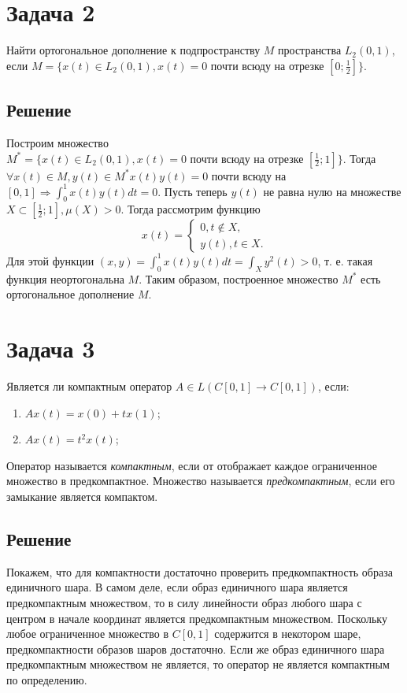 \documentclass[11pt]{article}
\begin{document}
\section{Задача 2}
\label{sec:orgfe02e9f}
Найти ортогональное дополнение к подпространству \(M\) пространства \(L_2(0, 1)\), если \(M = \{x(t) \in L_2(0, 1), x(t) = 0 \text{ почти всюду на отрезке }[0; \frac12]\}\).
\subsection{Решение}
\label{sec:org3e93dc5}
Построим множество \(M^* = \{x(t) \in L_2(0, 1), x(t) = 0 \text{ почти всюду на отрезке } [\frac12; 1]\}\). Тогда \(\forall x(t) \in M, y(t) \in M^* x(t)y(t) = 0\) почти всюду на \([0, 1] \Rightarrow \int_0^1x(t)y(t)dt = 0\). Пусть теперь \(y(t)\) не равна нулю на множестве \(X \subset [\frac12; 1], \mu(X) > 0\). Тогда рассмотрим функцию
\begin{equation*}
x(t) = \begin{cases}
0, t \notin X, \\
y(t), t \in X.
\end{cases}
\end{equation*}
Для этой функции \((x, y) = \int_0^1x(t)y(t)dt = \int_Xy^2(t) > 0\), т. е. такая функция неортогональна \(M\). Таким образом, построенное множество \(M^*\) есть ортогональное дополнение \(M\).
\section{Задача 3}
\label{sec:org2d7f3b7}
Является ли компактным оператор \(A \in L(C[0, 1] \rightarrow C[0, 1])\), если:
\begin{enumerate}
\item \(Ax(t) = x(0) + tx(1)\);
\item \(Ax(t) = t^2x(t)\);
\end{enumerate}
Оператор называется \emph{компактным}, если от отображает каждое ограниченное множество в предкомпактное. Множество называется \emph{предкомпактным}, если его замыкание является компактом.
\subsection{Решение}
\label{sec:orgfeb8695}
Покажем, что для компактности достаточно проверить предкомпактность образа единичного шара. В самом деле, если образ единичного шара является предкомпактным множеством, то в силу линейности образ любого шара с центром в начале координат является предкомпактным множеством. Поскольку любое ограниченное множество в \(C[0, 1]\) содержится в некотором шаре, предкомпактности образов шаров достаточно. Если же образ единичного шара предкомпактным множеством не является, то оператор не является компактным по определению.
\end{document}
